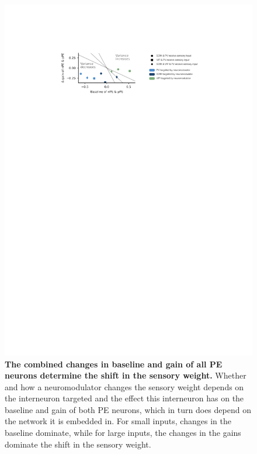 \documentclass[10pt,a4paper]{article}
\providecommand{\DIFaddbeginFL}{} %
\providecommand{\DIFaddendFL}{} %
\providecommand{\DIFdelbeginFL}{} %
\providecommand{\DIFdelendFL}{} %
\newcommand{\DIFscaledelfig}{0.5}
\newlength{\DIFdelgraphicswidth} %
\newlength{\DIFdelgraphicsheight} %
\newcommand{\DIFaddincludegraphics}[2][]{{\color{blue}\fbox{\DIFOincludegraphics[#1]{#2}}}} %
\newcommand{\DIFdelincludegraphics}[2][]{%
\sbox{\DIFdelgraphicsbox}{\DIFOincludegraphics[#1]{#2}}%
\settoboxwidth{\DIFdelgraphicswidth}{\DIFdelgraphicsbox} %
\settoboxtotalheight{\DIFdelgraphicsheight}{\DIFdelgraphicsbox} %
\scalebox{\DIFscaledelfig}{%
\parbox[b]{\DIFdelgraphicswidth}{\usebox{\DIFdelgraphicsbox}\\[-\baselineskip] \rule{\DIFdelgraphicswidth}{0em}}\llap{\resizebox{\DIFdelgraphicswidth}{\DIFdelgraphicsheight}{%
\setlength{\unitlength}{\DIFdelgraphicswidth}%
\begin{picture}(1,1)%
\thicklines\linethickness{2pt} %
{\color[rgb]{1,0,0}\put(0,0){\framebox(1,1){}}}%
{\color[rgb]{1,0,0}\put(0,0){\line( 1,1){1}}}%
{\color[rgb]{1,0,0}\put(0,1){\line(1,-1){1}}}%
\end{picture}%
}\hspace*{3pt}}} %
} %
\DeclareRobustCommand{\DIFaddbeginFL}{\DIFOaddbeginFL \let\includegraphics\DIFaddincludegraphics} %
\DeclareRobustCommand{\DIFaddendFL}{\DIFOaddendFL \let\includegraphics\DIFOincludegraphics} %
\DeclareRobustCommand{\DIFdelbeginFL}{\DIFOdelbeginFL \let\includegraphics\DIFdelincludegraphics} %
\DeclareRobustCommand{\DIFdelendFL}{\DIFOaddendFL \let\includegraphics\DIFOincludegraphics} %
\begin{document}
\begin{figure}[!h]
	\centering
    \includegraphics{../results/figures/final/Fig_4_S4}%
\caption{\DIFdelbeginFL %
\DIFdelendFL \DIFaddbeginFL \footnotesize{\bf The combined changes in baseline and gain of all PE neurons determine the shift in the sensory weight.\newline}  
\DIFaddendFL Whether and how a neuromodulator changes the sensory weight depends on the interneuron targeted and the effect this interneuron has on the baseline and gain of both PE neurons, which in turn does depend on the network it is embedded in. For small inputs, changes in the baseline dominate, while for large inputs, the changes in the gains dominate the shift in the sensory weight.
}
\label{fig:Fig_4_S4}
\end{figure}
\end{document}
